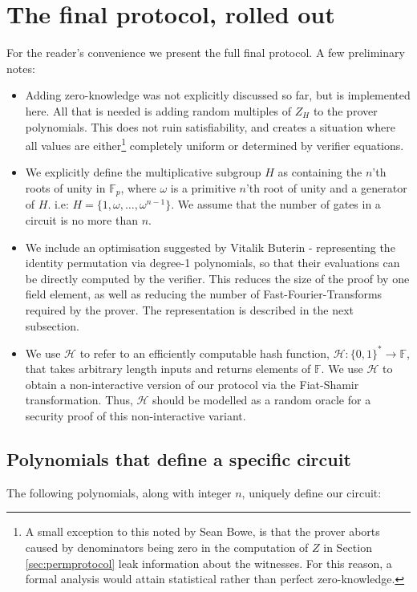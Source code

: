 \documentclass[11pt]{article} %
\newcommand{\F}{\ensuremath{\mathbb F}\xspace}
\newcommand{\hash}{\ensuremath{\mathcal{H}}\xspace}
\begin{document}
 
 
 \section{The final protocol, rolled out}\label{sec:finalconst}
 For the reader's convenience we present the full final protocol. 
 A few preliminary notes:
\begin{itemize}
 \item  Adding zero-knowledge was not explicitly discussed so far, but is implemented here.
 All that is needed is adding random multiples of $Z_{H}$ to the prover polynomials. This does not ruin satisfiability, and creates a situation where all values are either\footnote{A small  exception to this noted by Sean Bowe, is that the prover aborts caused by  denominators being zero in the computation of $Z$ in Section \ref{sec:permprotocol} leak information about the witnesses. For this reason, a formal analysis would attain statistical rather than perfect zero-knowledge.} completely uniform or determined by verifier equations.
\item We explicitly define the multiplicative subgroup $H$ as containing the $n$'th roots of unity in $\F_p$, where $\omega$ is a primitive $n$'th root of unity and a generator of $H$. i.e: $H = \{1, \omega, \ldots, \omega^{n-1}\}$. We assume that the number of gates in a circuit is no more than $n$.
\item  We include an optimisation suggested by Vitalik Buterin - representing the identity permutation via degree-1 polynomials, so that their evaluations can be directly computed by the verifier. This reduces the size of the proof by one field element, as well as reducing the number of Fast-Fourier-Transforms required by the prover. The representation is described in the next subsection.
\item We use \hash to refer to an efficiently computable hash function, $\hash:\{0,1\}^*\to \F$, that takes arbitrary length inputs and returns elements of \F. We use \hash to obtain a non-interactive version of our protocol via the Fiat-Shamir transformation. Thus, \hash should be modelled as a random oracle for a security proof of this non-interactive variant.
\end{itemize}

\subsection{Polynomials that define a specific circuit}

The following polynomials, along with integer $n$, uniquely define our circuit:
\end{document}

